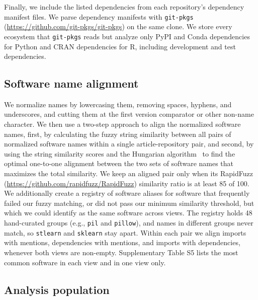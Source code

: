 \documentclass[pdflatex,sn-nature]{sn-jnl}%
\begin{document}
Finally, we include the listed dependencies from each repository's dependency manifest files.
We parse dependency manifests with \texttt{git-pkgs} (\url{https://github.com/git-pkgs/git-pkgs}) on the same clone.
We store every ecosystem that \texttt{git-pkgs} reads but analyze only PyPI and Conda dependencies for Python and CRAN dependencies for R, including development and test dependencies.

\subsection{Software name alignment}\label{subsec:m-alignment}

We normalize names by lowercasing them, removing spaces, hyphens, and underscores, and cutting them at the first version comparator or other non-name character.
We then use a two-step approach to align the normalized software names, first, by calculating the fuzzy string similarity between all pairs of normalized software names within a single article-repository pair, and second, by using the string similarity scores and the Hungarian algorithm~\cite{crouse2016implementing} to find the optimal one-to-one alignment between the two sets of software names that maximizes the total similarity.
We keep an aligned pair only when its RapidFuzz (\url{https://github.com/rapidfuzz/RapidFuzz}) similarity ratio is at least 85 of 100.
We additionally create a registry of software aliases for software that frequently failed our fuzzy matching, or did not pass our minimum similarity threshold, but which we could identify as the same software across views.
The registry holds 48 hand-curated groups (e.g., \texttt{pil} and \texttt{pillow}), and names in different groups never match, so \texttt{stlearn} and \texttt{sklearn} stay apart.
Within each pair we align imports with mentions, dependencies with mentions, and imports with dependencies, whenever both views are non-empty.
Supplementary Table S5 lists the most common software in each view and in one view only.

\subsection{Analysis population}\label{subsec:m-population}
\end{document}
